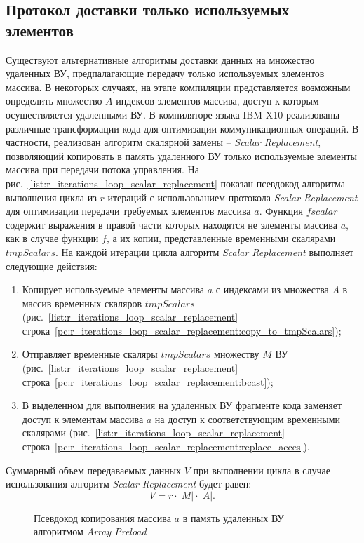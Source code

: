 \subsection{Протокол доставки только используемых элементов}
Существуют альтернативные алгоритмы доставки данных на множество удаленных ВУ,
предпалагающие передачу только используемых элементов массива. В некоторых
случаях, на этапе компиляции представляется возможным определить множество $A$
индексов элементов массива, доступ к которым осуществляется удаленными ВУ.
В компиляторе языка IBM X10 реализованы различные трансформации кода для
оптимизации коммуникационных операций. В частности, реализован алгоритм
скалярной замены -- \textit{Scalar Replacement}, позволяющий копировать в память
удаленного ВУ только используемые элементы массива при передачи потока
управления. На рис.~\ref{list:r_iterations_loop_scalar_replacement} показан
псевдокод алгоритма выполнения цикла из $r$ итераций с использованием протокола
\textit{Scalar Replacement} для оптимизации передачи требуемых элементов массива
$a$. Функция $fscalar$ содержит выражения в правой части которых находятся
не элементы массива $a$, как в случае функции $f$, а их копии, представленные
временными скалярами $tmpScalars$. На каждой итерации цикла алгоритм
\textit{Scalar Replacement} выполняет следующие действия:
\begin{enumerate}
\item Копирует используемые элементы массива $a$ с индексами из множества $A$ в
массив временных скаляров $tmpScalars$
(рис.~\ref{list:r_iterations_loop_scalar_replacement}
строка~\ref{pc:r_iterations_loop_scalar_replacement:copy_to_tmpScalars});
\item Отправляет временные скаляры $tmpScalars$ множеству $M$ ВУ
(рис.~\ref{list:r_iterations_loop_scalar_replacement}
строка~\ref{pc:r_iterations_loop_scalar_replacement:bcast});
\item В выделенном для выполнения на удаленных ВУ фрагменте кода заменяет доступ
к элементам массива $a$ на доступ к соответствующим временными скалярами
(рис.~\ref{list:r_iterations_loop_scalar_replacement}
строка~\ref{pc:r_iterations_loop_scalar_replacement:replace_acces}).
\end{enumerate}

Суммарный объем передаваемых данных $V$ при выполнении цикла в случае
использования алгоритм \textit{Scalar Replacement} будет равен:
\[ V = r \cdot |M| \cdot |A|. \]

\begin{figure}[!h]
	
    \caption{Псевдокод копирования массива $a$ в память удаленных ВУ алгоритмом
\textit{Array Preload}}
    \label{list:r_iterations_loop_array_preload}
\end{figure}

